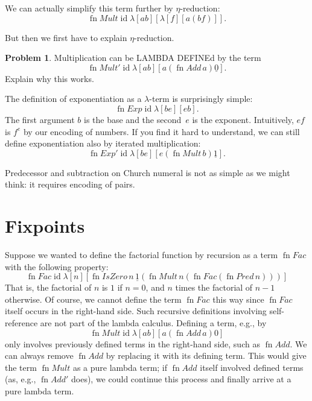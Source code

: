 \documentclass[10pt,a4paper]{article}
\newcommand*{\olup}[1]{\MakeUppercase{#1}}
\theoremstyle{plain}
\theoremstyle{definition}
\newtheorem{prob}{Problem}[section]
\theoremstyle{remark}
\newenvironment{editorial}{}{}
\newcommand*{\olfileid}[3]{}
\newcommand*{\olsection}[1]{\section*{#1}}
\providecommand{\num}[1]{\underline{#1}}
\providecommand{\lambd}{\ensuremath{\lambda}}
\providecommand{\ident}{\operatorname{id}}
\providecommand{\fn}{\operatorname{fn}}
\begin{document}
\begin{editorial}
We can actually simplify this term further by $\eta$-reduction:
\[
  \fn{Mult} \ident \lambd[ab][\lambd[f][a (b f)]].
\]

But then we first have to explain $\eta$-reduction.
\end{editorial}

\begin{prob}
Multiplication can be \olup{lambda define}d by the term
\[
  \fn{Mult}' \ident \lambd[ab][a (\fn{Add}\, a) \num{0}].
\]
Explain why this works.
\end{prob}

The definition of exponentiation as a $\lambd$-term is
surprisingly simple:
\[
  \fn{Exp} \ident \lambd[be][e b].
\]
The first argument $b$ is the base and the second~$e$ is the exponent.
Intuitively, $e f$ is $f^e$ by our encoding of numbers. If you find it
hard to understand, we can still define exponentiation also by
iterated multiplication:
\[
  \fn{Exp}' \ident \lambd[be][e (\fn{Mult}\, b) \num{1}].
\]

Predecessor and subtraction on Church numeral is not as simple as we
might think: it requires encoding of pairs.





\olfileid{lam}{ldf}{fp}

\olsection{Fixpoints}

Suppose we wanted to define the factorial function by recursion as a
term $\fn{Fac}$ with the following property:
\[
\fn{Fac} \ident \lambd[n][\fn{IsZero}\, n\, \num 1 (\fn{Mult}\, n (\fn{Fac}(\fn{Pred} \, n)))]
\]
That is, the factorial of $n$ is $1$ if $n = 0$, and $n$ times the
factorial of $n-1$ otherwise.  Of course, we cannot define the term
$\fn{Fac}$ this way since $\fn{Fac}$ itself occurs in the right-hand
side. Such recursive definitions involving self-reference
are not part of the lambda calculus. Defining a term, e.g., by
\[
\fn{Mult} \ident \lambd[ab][a (\fn{Add}\, a) 0]
\]
only involves previously defined terms in the right-hand side, such as
$\fn{Add}$. We can always remove $\fn{Add}$ by replacing it with its
defining term.  This would give the term $\fn{Mult}$ as a pure lambda
term; if $\fn{Add}$ itself involved defined terms (as, e.g.,
$\fn{Add}'$ does), we could continue this process and finally arrive at
a pure lambda term.
\end{document}
